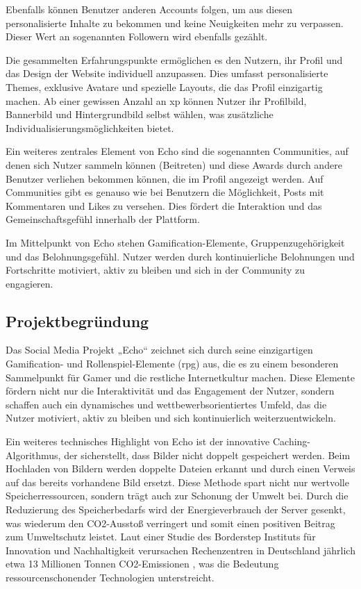 \documentclass[a4paper,12pt]{article}
\begin{document}
Ebenfalls können Benutzer anderen Accounts folgen, um aus diesen personalisierte Inhalte zu bekommen und keine Neuigkeiten mehr zu verpassen. Dieser Wert an sogenannten Followern wird ebenfalls gezählt.

Die gesammelten Erfahrungspunkte ermöglichen es den Nutzern, ihr Profil und das Design der Website individuell anzupassen. Dies umfasst personalisierte Themes, exklusive Avatare und spezielle Layouts, die das Profil einzigartig machen. Ab einer gewissen Anzahl an \gls{xp} können Nutzer ihr Profilbild, Bannerbild und Hintergrundbild selbst wählen, was zusätzliche Individualisierungsmöglichkeiten bietet.

Ein weiteres zentrales Element von Echo sind die sogenannten Communities, auf denen sich Nutzer sammeln können (Beitreten) und diese Awards durch andere Benutzer verliehen bekommen können, die im Profil angezeigt werden. Auf Communities gibt es genauso wie bei Benutzern die Möglichkeit, Posts mit Kommentaren und Likes zu versehen. Dies fördert die Interaktion und das Gemeinschaftsgefühl innerhalb der Plattform.

Im Mittelpunkt von Echo stehen Gamification-Elemente, Gruppenzugehörigkeit und das Belohnungsgefühl. Nutzer werden durch kontinuierliche Belohnungen und Fortschritte motiviert, aktiv zu bleiben und sich in der Community zu engagieren.

\newpage
\subsection{Projektbegründung}
Das Social Media Projekt „Echo“ zeichnet sich durch seine einzigartigen Gamification- und Rollenspiel-Elemente (\gls{rpg}) aus, die es zu einem besonderen Sammelpunkt für Gamer und die restliche Internetkultur machen. Diese Elemente fördern nicht nur die Interaktivität und das Engagement der Nutzer, sondern schaffen auch ein dynamisches und wettbewerbsorientiertes Umfeld, das die Nutzer motiviert, aktiv zu bleiben und sich kontinuierlich weiterzuentwickeln.

Ein weiteres technisches Highlight von Echo ist der innovative Caching-Algorithmus, der sicherstellt, dass Bilder nicht doppelt gespeichert werden. Beim Hochladen von Bildern werden doppelte Dateien erkannt und durch einen Verweis auf das bereits vorhandene Bild ersetzt. Diese Methode spart nicht nur wertvolle Speicherressourcen, sondern trägt auch zur Schonung der Umwelt bei. Durch die Reduzierung des Speicherbedarfs wird der Energieverbrauch der Server gesenkt, was wiederum den CO2-Ausstoß verringert und somit einen positiven Beitrag zum Umweltschutz leistet. Laut einer Studie des Borderstep Instituts für Innovation und Nachhaltigkeit verursachen Rechenzentren in Deutschland jährlich etwa 13 Millionen Tonnen CO2-Emissionen \cite{borderstep2020}, was die Bedeutung ressourcenschonender Technologien unterstreicht.
\end{document}
